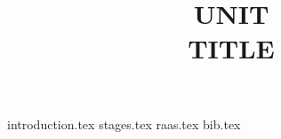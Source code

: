 \documentclass[11pt,english]{article}
\begin{document}
\title{UNIT\\TITLE}
\maketitle

\newpage{}
\tableofcontents{}
\listoffigures
\newpage

{introduction.tex}
{stages.tex}
{raas.tex}
{bib.tex}
\end{document}
